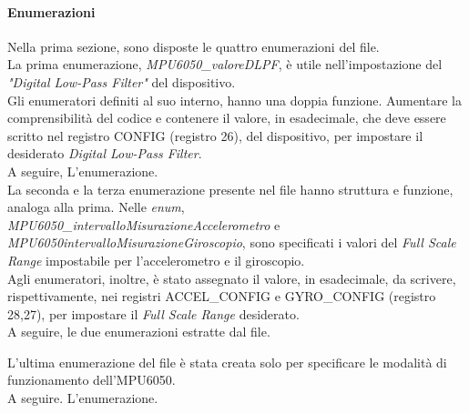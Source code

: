 \documentclass[11pt]{report}
\begin{document}
\paragraph{Enumerazioni}
Nella prima sezione, sono disposte le quattro enumerazioni del file.\\
La prima enumerazione, \textit{MPU6050\_valoreDLPF}, è utile nell'impostazione del \textit{"Digital Low-Pass Filter"} del dispositivo.\\
Gli enumeratori definiti al suo interno, hanno una doppia funzione. Aumentare la comprensibilità del codice e contenere
il valore, in esadecimale, che deve essere scritto nel registro CONFIG (registro 26), del dispositivo, per impostare il desiderato \textit{Digital Low-Pass Filter}.\\
A seguire, L'enumerazione.\\

La seconda e la terza enumerazione presente nel file hanno struttura e funzione, analoga alla prima.
Nelle \textit{enum},\\ \textit{MPU6050\_intervalloMisurazioneAccelerometro} e \textit{MPU6050intervalloMisurazioneGiroscopio}, sono specificati i valori del \textit{Full Scale Range} impostabile per l'accelerometro e il giroscopio.\\
Agli enumeratori, inoltre, è stato assegnato il valore, in esadecimale, da scrivere, rispettivamente, nei registri ACCEL\_CONFIG e GYRO\_CONFIG (registro 28,27), per impostare il \textit{Full Scale Range} desiderato.\\
A seguire, le due enumerazioni estratte dal file.
\newpage

L'ultima enumerazione del file è stata creata solo per specificare le modalità di funzionamento dell'MPU6050.\\
A seguire. L'enumerazione.\\

\end{document}
